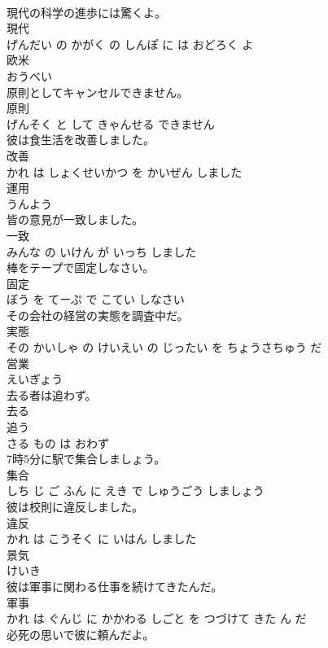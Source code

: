 \documentclass[8pt]{extreport}
\begin{document}
\begin{CJK}{UTF8}{min}
\\	現代の科学の進歩には驚くよ。	
\\	現代 
\\	げんだい の かがく の しんぽ に は おどろく よ			
\\	欧米	
\\	おうべい			
\\	原則としてキャンセルできません。	
\\	原則 
\\	げんそく と して きゃんせる できません			
\\	彼は食生活を改善しました。	
\\	改善 
\\	かれ は しょくせいかつ を かいぜん しました			
\\	運用	
\\	うんよう			
\\	皆の意見が一致しました。	
\\	一致 
\\	みんな の いけん が いっち しました			
\\	棒をテープで固定しなさい。	
\\	固定 
\\	ぼう を てーぷ で こてい しなさい			
\\	その会社の経営の実態を調査中だ。	
\\	実態 
\\	その かいしゃ の けいえい の じったい を ちょうさちゅう だ			
\\	営業	
\\	えいぎょう			
\\	去る者は追わず。	
\\	去る 
\\	追う 
\\	さる もの は おわず			
\\	7時5分に駅で集合しましょう。	
\\	集合 
\\	しち じ ご ふん に えき で しゅうごう しましょう			
\\	彼は校則に違反しました。	
\\	違反 
\\	かれ は こうそく に いはん しました			
\\	景気	
\\	けいき			
\\	彼は軍事に関わる仕事を続けてきたんだ。	
\\	軍事 
\\	かれ は ぐんじ に かかわる しごと を つづけて きた ん だ			
\\	必死の思いで彼に頼んだよ。	

\end{CJK}
\end{document}
